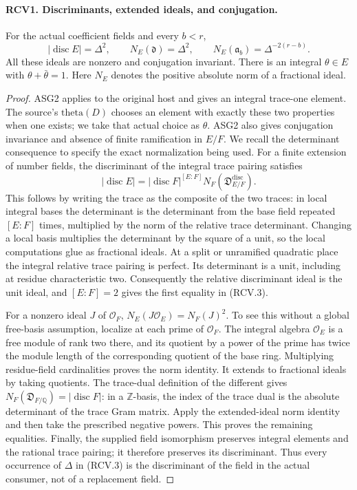 \documentclass[11pt,a4paper]{article}
\numberwithin{equation}{section}
\theoremstyle{remark}\newtheorem{remark}[theorem]{Remark}
\begin{document}
\paragraph{RCV1. Discriminants, extended ideals, and conjugation.}
\label{claim:RCV1}
For the actual coefficient fields and every \(b<r\),
\[
 |\operatorname{disc}E|=\Delta^2,\qquad
 N_E(\mathfrak d)=\Delta^2,\qquad
 N_E(\mathfrak a_b)=\Delta^{-2(r-b)}.
\tag{RCV.3}
\]
All these ideals are nonzero and conjugation invariant.  There is an
integral \(\theta\in E\) with \(\theta+\bar\theta=1\).
Here \(N_E\) denotes the positive absolute norm of a fractional ideal.
\begin{proof}
ASG2 applies to the original host and gives an integral trace-one
element.  The source's \(\mathrm{theta}(D)\) chooses an element with
exactly these two properties when one exists; we take that actual
choice as \(\theta\).  ASG2 also gives conjugation invariance and
absence of finite ramification in
\(E/F\).  We recall the determinant consequence to specify the exact
normalization being used.  For a finite extension of number fields,
the discriminant of the integral trace pairing satisfies
\[
 |\operatorname{disc}E|
 =|\operatorname{disc}F|^{[E:F]}
       N_F(\mathfrak D_{E/F}^{\mathrm{disc}}).
\]
This follows by writing the trace as the composite of the two traces:
in local integral bases the determinant is the determinant from the
base field repeated \([E:F]\) times, multiplied by the norm of the
relative trace determinant.  Changing a local basis multiplies the
determinant by the square of a unit, so the local computations glue
as fractional ideals.  At a split or unramified quadratic place the
integral relative trace pairing is perfect.  Its determinant is a
unit, including at residue characteristic two.  Consequently the
relative discriminant ideal is the unit ideal, and \([E:F]=2\) gives
the first equality in (RCV.3).

For a nonzero ideal \(J\) of \(\mathcal O_F\),
\(N_E(J\mathcal O_E)=N_F(J)^2\).  To see this without a global
free-basis assumption, localize at each prime of \(\mathcal O_F\).
The integral algebra \(\mathcal O_E\) is a free module of rank two
there, and its quotient by a power of the prime has twice the
module length of the corresponding quotient of the base ring.
Multiplying residue-field cardinalities proves the norm identity.
It extends to fractional ideals by taking quotients.
The trace-dual definition of the different gives
\(N_F(\mathfrak D_{F/\mathbb Q})=|\operatorname{disc}F|\): in a
\(\mathbb Z\)-basis, the index of the trace dual is the absolute
determinant of the trace Gram matrix.  Apply the extended-ideal norm
identity and then take the prescribed negative powers.  This proves
the remaining equalities.  Finally, the supplied field isomorphism
preserves integral elements and the rational trace pairing; it
therefore preserves its discriminant.  Thus every occurrence of
\(\Delta\) in (RCV.3) is the discriminant of the field in the actual
consumer, not of a replacement field.
\end{proof}
\end{document}

